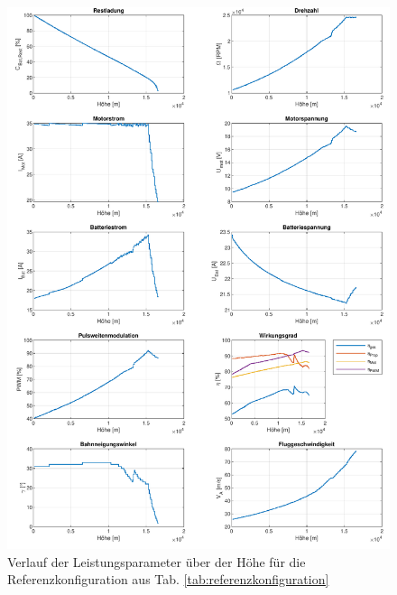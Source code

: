 \begin{figure}[H]
	\includegraphics[scale=0.7]{Diagramme/Ausgangskonstellation.pdf}
	\caption{Verlauf der Leistungsparameter über der Höhe für die Referenzkonfiguration aus Tab. \ref{tab:referenzkonfiguration}}
	\label{abb:referenzkonfiguration}
\end{figure}

